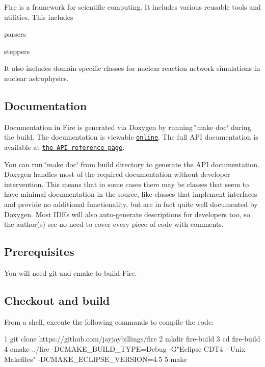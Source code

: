 Fire is a framework for scientific computing. It includes various reusable tools and utilities. This includes
\begin{DoxyItemize}
\item parsers
\item steppers
\end{DoxyItemize}

It also includes domain-\/specific classes for nuclear reaction network simulations in nuclear astrophysics.

\subsection*{Documentation}

Documentation in Fire is generated via Doxygen by running \char`\"{}make doc\char`\"{} during the build. The documentation is viewable \href{http://www.jayjaybillings.com/fire}{\tt online}. The full A\+PI documentation is available at \href{http://www.jayjaybillings.com/fire/api/html/}{\tt the A\+PI reference page}.

You can run \char`\"{}make doc\char`\"{} from build directory to generate the A\+PI documentation. Doxygen handles most of the required documentation without developer intervention. This means that in some cases there may be classes that seem to have minimal documentation in the source, like classes that implement interfaces and provide no additional functionality, but are in fact quite well documented by Doxygen. Most I\+D\+Es will also auto-\/generate descriptions for developers too, so the author(s) see no need to cover every piece of code with comments.

\subsection*{Prerequisites}

You will need git and cmake to build Fire.

\subsection*{Checkout and build}

From a shell, execute the following commands to compile the code\+:


\begin{DoxyCode}
1 git clone https://github.com/jayjaybillings/fire
2 mkdir fire-build
3 cd fire-build
4 cmake ../fire -DCMAKE\_BUILD\_TYPE=Debug -G"Eclipse CDT4 - Unix Makefiles" -DCMAKE\_ECLIPSE\_VERSION=4.5
5 make
\end{DoxyCode}


